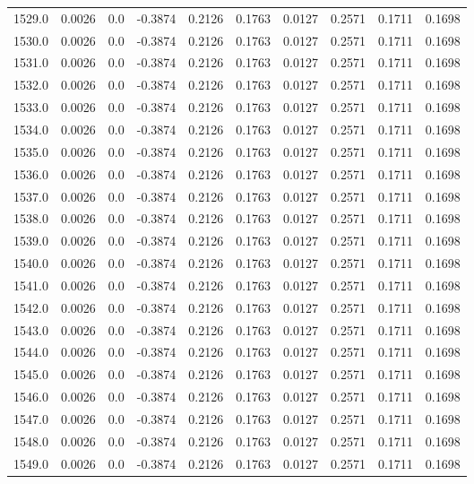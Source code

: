 \begin{longtable}{lrrrrrrrrr}
1529.0 & 0.0026 & 0.0 & -0.3874 & 0.2126 & 0.1763 & 0.0127 & 0.2571 & 0.1711 & 0.1698 \\
1530.0 & 0.0026 & 0.0 & -0.3874 & 0.2126 & 0.1763 & 0.0127 & 0.2571 & 0.1711 & 0.1698 \\
1531.0 & 0.0026 & 0.0 & -0.3874 & 0.2126 & 0.1763 & 0.0127 & 0.2571 & 0.1711 & 0.1698 \\
1532.0 & 0.0026 & 0.0 & -0.3874 & 0.2126 & 0.1763 & 0.0127 & 0.2571 & 0.1711 & 0.1698 \\
1533.0 & 0.0026 & 0.0 & -0.3874 & 0.2126 & 0.1763 & 0.0127 & 0.2571 & 0.1711 & 0.1698 \\
1534.0 & 0.0026 & 0.0 & -0.3874 & 0.2126 & 0.1763 & 0.0127 & 0.2571 & 0.1711 & 0.1698 \\
1535.0 & 0.0026 & 0.0 & -0.3874 & 0.2126 & 0.1763 & 0.0127 & 0.2571 & 0.1711 & 0.1698 \\
1536.0 & 0.0026 & 0.0 & -0.3874 & 0.2126 & 0.1763 & 0.0127 & 0.2571 & 0.1711 & 0.1698 \\
1537.0 & 0.0026 & 0.0 & -0.3874 & 0.2126 & 0.1763 & 0.0127 & 0.2571 & 0.1711 & 0.1698 \\
1538.0 & 0.0026 & 0.0 & -0.3874 & 0.2126 & 0.1763 & 0.0127 & 0.2571 & 0.1711 & 0.1698 \\
1539.0 & 0.0026 & 0.0 & -0.3874 & 0.2126 & 0.1763 & 0.0127 & 0.2571 & 0.1711 & 0.1698 \\
1540.0 & 0.0026 & 0.0 & -0.3874 & 0.2126 & 0.1763 & 0.0127 & 0.2571 & 0.1711 & 0.1698 \\
1541.0 & 0.0026 & 0.0 & -0.3874 & 0.2126 & 0.1763 & 0.0127 & 0.2571 & 0.1711 & 0.1698 \\
1542.0 & 0.0026 & 0.0 & -0.3874 & 0.2126 & 0.1763 & 0.0127 & 0.2571 & 0.1711 & 0.1698 \\
1543.0 & 0.0026 & 0.0 & -0.3874 & 0.2126 & 0.1763 & 0.0127 & 0.2571 & 0.1711 & 0.1698 \\
1544.0 & 0.0026 & 0.0 & -0.3874 & 0.2126 & 0.1763 & 0.0127 & 0.2571 & 0.1711 & 0.1698 \\
1545.0 & 0.0026 & 0.0 & -0.3874 & 0.2126 & 0.1763 & 0.0127 & 0.2571 & 0.1711 & 0.1698 \\
1546.0 & 0.0026 & 0.0 & -0.3874 & 0.2126 & 0.1763 & 0.0127 & 0.2571 & 0.1711 & 0.1698 \\
1547.0 & 0.0026 & 0.0 & -0.3874 & 0.2126 & 0.1763 & 0.0127 & 0.2571 & 0.1711 & 0.1698 \\
1548.0 & 0.0026 & 0.0 & -0.3874 & 0.2126 & 0.1763 & 0.0127 & 0.2571 & 0.1711 & 0.1698 \\
1549.0 & 0.0026 & 0.0 & -0.3874 & 0.2126 & 0.1763 & 0.0127 & 0.2571 & 0.1711 & 0.1698 \\

\end{longtable}
